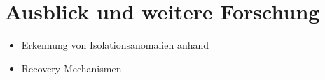 \section{Ausblick und weitere Forschung}


\begin{itemize}
	\item Erkennung von Isolationsanomalien anhand 
	\item Recovery-Mechanismen
\end{itemize}